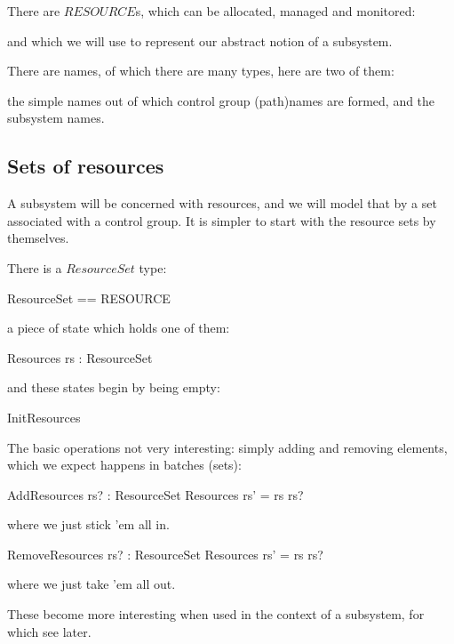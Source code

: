 \documentclass[a4paper,twoside,12pt]{article}
\begin{document}
There are $RESOURCE$s, which can be allocated, managed and monitored:
\begin{zed}
[RESOURCE]
\end{zed}
and which we will use to represent our abstract notion of a subsystem.

There are names, of which there are many types, here are two of them:
\begin{zed}
\end{zed}
the simple names out of which control group (path)names are formed, and the subsystem names.

\subsection{Sets of resources}

A subsystem will be concerned with resources, and we will model that by a set associated 
with a control group. It is simpler to start with the resource sets by themselves.

There is a $ResourceSet$ type:
\begin{zed}
ResourceSet == \finset RESOURCE
\end{zed}
a piece of state which holds one of them:
\begin{schema}{Resources}
rs : ResourceSet
\end{schema}
and these states begin by being empty:
\begin{zed}
InitResources 
\end{zed}

The basic operations not very interesting: simply adding and removing elements, which we expect happens
in batches (sets):

\begin{schema}{AddResources}
rs? : ResourceSet
\also
\Delta Resources
\where
rs' = rs \cup rs?
\end{schema}
where we just stick 'em all in.

\begin{schema}{RemoveResources}
rs? : ResourceSet
\also
\Delta Resources
\where
rs' = rs \setminus rs? 
\end{schema}
where we just take 'em all out.

These become more interesting when used in the context of a subsystem, for which see later.

\end{document}
